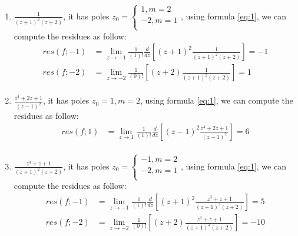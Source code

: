 \documentclass[a4paper,12pt]{article}
\begin{document}
\begin{enumerate}
\begin{enumerate}
		\item $\frac{1}{(z+1)^2 (z+2)}$, it has poles $z_0=\begin{cases}
		1, m= 2\\
		-2, m= 1\\
		\end{cases}$, using formula \eqref{eq:1}, we can compute the residues as follow:
		\begin{equation*}
		\begin{aligned}
		res(f;-1) &= \lim_{z\to -1} \frac{1}{(1)!} \frac{d}{dz} \left[ (z+1)^2 \frac{1}{(z+1)^2(z+2)}\right] = -1\\
		res(f;-2) &= \lim_{z\to -2} \frac{1}{(0)!} \left[ (z+2) \frac{1}{(z+1)^2(z+2)}\right] = 1\\
		\end{aligned}
		\end{equation*}
		
		\item $\frac{z^4+2z+1}{(z-1)^2}$, it has poles $z_0=1,m=2$, using formula \eqref{eq:1}, we can compute the residues as follow:
		\begin{equation*}
		\begin{aligned}
		res(f;1) &= \lim_{z\to 1} \frac{1}{(1)!} \frac{d}{dz} \left[ (z-1)^2 \frac{z^4+2z+1}{(z-1)^2}\right] = 6\\
		\end{aligned}
		\end{equation*}
		
		\item $\frac{z^3+z+1}{(z+1)^2(z+2)}$, it has poles $z_0=\begin{cases}
		-1, m= 2\\
		-2, m= 1\\
		\end{cases}$, using formula \eqref{eq:1}, we can compute the residues as follow:
		\begin{equation*}
		\begin{aligned}
		res(f;-1) &= \lim_{z\to -1} \frac{1}{(1)!} \frac{d}{dz} \left[ (z+1)^2 \frac{z^3+z+1}{(z+1)^2(z+2)}\right] = 5\\
		res(f;-2) &= \lim_{z\to -2} \frac{1}{(0)!} \left[ (z+2) \frac{z^3+z+1}{(z+1)^2(z+2)}\right] = -10\\
		\end{aligned}
		\end{equation*}
		

\end{enumerate}
\end{enumerate}
\end{document}
